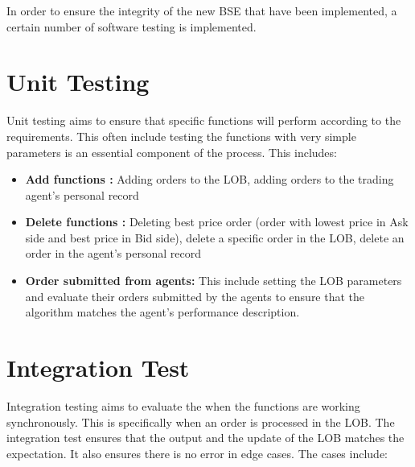 In order to ensure the integrity of the new BSE that have been implemented, a certain number of software testing is implemented. 

\section{Unit Testing} 
Unit testing aims to ensure that specific functions will perform according to the requirements. This often include testing the functions with very simple parameters is an essential component of the process. This includes:

\begin{itemize}
    \item \textbf{Add functions : } Adding orders to the LOB, adding orders to the trading agent's personal record 
    
    \item \textbf{Delete functions : } Deleting best price order (order with lowest price in Ask side and best price in Bid side), delete a specific order in the LOB, delete an order in the agent's personal record 
    
     \item \textbf{Order submitted from agents: } This include setting the LOB parameters and evaluate their orders submitted by the agents to ensure that the algorithm matches the agent's performance description. 
\end{itemize} 

\section{Integration Test}
Integration testing aims to evaluate the when the functions are working synchronously. This is specifically when an order is processed in the LOB. The integration test ensures that the output and the update of the LOB matches the expectation. It also ensures there is no error in edge cases. The cases include: 


